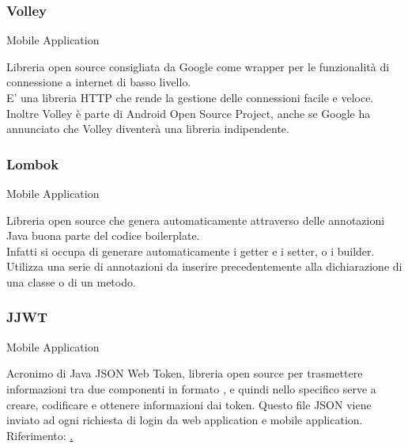 \documentclass[../../../analisi-dei-requisiti.tex]{subfiles}
\begin{document}
\subsubsection{Volley}%
\label{subs:volley}
Mobile Application

Libreria open source consigliata da Google come wrapper per le funzionalità di connessione a internet di basso livello.\\
E' una libreria HTTP che rende la gestione delle connessioni facile e veloce.\\
Inoltre Volley è parte di Android Open Source Project, anche se Google ha annunciato che Volley 
diventerà una libreria indipendente.

\subsubsection{Lombok}%
\label{subs:lombok}
Mobile Application

Libreria open source che genera automaticamente attraverso delle annotazioni Java buona parte del codice boilerplate.\\
Infatti si occupa di generare automaticamente i getter e i setter, o i builder.\\
Utilizza una serie di annotazioni da inserire precedentemente alla dichiarazione di una classe o di un metodo.


\subsubsection{JJWT}%
\label{subs:jjwt}
Mobile Application

Acronimo di Java JSON Web Token, libreria open source per trasmettere informazioni tra due componenti in formato , e quindi nello specifico serve a creare, codificare e ottenere informazioni dai token. Questo file JSON viene inviato ad ogni richiesta di login da web application e mobile application.
Riferimento: \href{https://github.com/jwtk/jjwt}.
\end{document}
